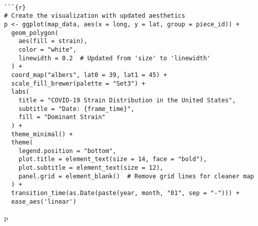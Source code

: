 \documentclass[
]{article}
\newenvironment{Shaded}{\begin{snugshade}}{\end{snugshade}}
\newcommand{\NormalTok}[1]{\textcolor[rgb]{0.00,0.23,0.31}{#1}}
\begin{document}
\begin{verbatim}

```{r}
# Create the visualization with updated aesthetics
p <- ggplot(map_data, aes(x = long, y = lat, group = piece_id)) +
  geom_polygon(
    aes(fill = strain),
    color = "white",
    linewidth = 0.2  # Updated from 'size' to 'linewidth'
  ) +
  coord_map("albers", lat0 = 39, lat1 = 45) +
  scale_fill_brewer(palette = "Set3") +
  labs(
    title = "COVID-19 Strain Distribution in the United States",
    subtitle = "Date: {frame_time}",
    fill = "Dominant Strain"
  ) +
  theme_minimal() +
  theme(
    legend.position = "bottom",
    plot.title = element_text(size = 14, face = "bold"),
    plot.subtitle = element_text(size = 12),
    panel.grid = element_blank()  # Remove grid lines for cleaner map
  ) +
  transition_time(as.Date(paste(year, month, "01", sep = "-"))) +
  ease_aes('linear')
\end{verbatim}

\begin{Shaded}
\begin{Highlighting}[]
\NormalTok{p}
\end{Highlighting}
\end{Shaded}

\begin{Shaded}
\begin{Highlighting}[]

\end{Highlighting}
\end{Shaded}
\end{document}
